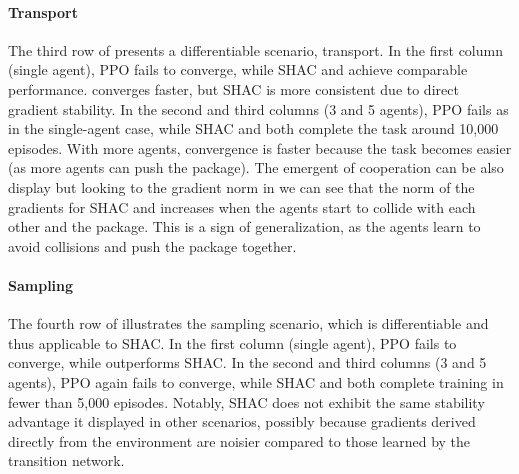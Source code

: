 \paragraph{Transport}
The third row of  presents a differentiable scenario, transport. In the first column (single agent), PPO fails to converge, while SHAC and \fname{} achieve comparable performance. \fname{} converges faster, but SHAC is more consistent due to direct gradient stability. In the second and third columns (3 and 5 agents), PPO fails as in the single-agent case, while SHAC and \fname{} both complete the task around 10,000 episodes. With more agents, convergence is faster because the task becomes easier (as more agents can push the package). The emergent of cooperation can be also display but looking to the gradient norm in  we can see that the norm of the gradients for SHAC and \fname{} increases when the agents start to collide with each other and the package. This is a sign of generalization, as the agents learn to avoid collisions and push the package together.

\paragraph{Sampling}
The fourth row of  illustrates the sampling scenario, which is differentiable and thus applicable to SHAC. In the first column (single agent), PPO fails to converge, while \fname{} outperforms SHAC. In the second and third columns (3 and 5 agents), PPO again fails to converge, while SHAC and \fname{} both complete training in fewer than 5,000 episodes. Notably, SHAC does not exhibit the same stability advantage it displayed in other scenarios, possibly because gradients derived directly from the environment are noisier compared to those learned by the transition network.
